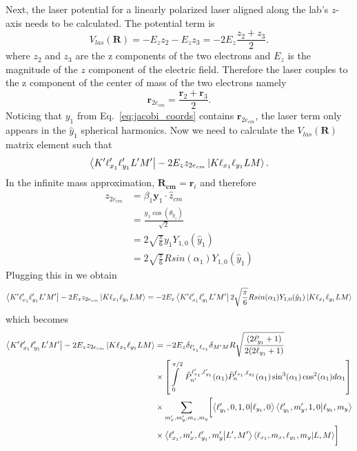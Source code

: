 Next, the laser potential for a linearly polarized laser aligned along the lab's $z$-axis needs to be calculated. The potential term is
\begin{equation}
     V_{las}(\mathbf{R}) = - E_z z_2 - E_z z_3 = - 2E_z \frac{z_2 + z_3}{2}.
\end{equation} 
where $z_2$ and $z_3$ are the z components of the two electrons and $E_z$ is the magnitude of the $z$ component of the electric field.
Therefore the laser couples to the z component of the center of mass of the two electrons namely
\begin{equation}
    \mathbf{r}_{2e_{cm}} = \frac{\mathbf{r}_2 + \mathbf{r}_3}{2}.
\end{equation}
Noticing that $y_1$ from Eq.~\ref{eq:jacobi_coords} contains $\mathbf{r}_{2e_{cm}}$, the laser term only appears in the $\hat{y}_1$ spherical harmonics. 
Now we need to calculate the $V_{las}(\mathbf{R})$ matrix element such that
\begin{equation}
    \bra{K'\ell_{x_1}'\ell_{y_1}'L'M'} -2E_z z_{2e_{cm}} \ket{K \ell_{x_1} \ell_{y_1}LM}.
\end{equation} 
In the infinite mass approximation, $\mathbf{R_{cm}}=\mathbf{r}_i$  and therefore 
\begin{align}
z_{2e_{cm}}&=\beta_1 \mathbf{y}_1\cdot\hat{z}_{cm} \\
&= \frac{y_1\cos(\theta_{y_1})}{\sqrt{2}}\\
&= 2 \sqrt{\frac{\pi}{6}}y_1Y_{1,0}(\hat{y}_1)\\
&= 2 \sqrt{\frac{\pi}{6}}Rsin(\alpha_1)Y_{1,0}(\hat{y}_1)
\end{align}
Plugging this in we obtain 
\begin{equation}
    \bra{K'\ell_{x_1}'\ell_{y_1}'L'M'}  -2E_z z_{2e_{cm}} \ket{K \ell_{x_1} \ell_{y_1}LM} =-2E_z \bra{K'\ell_{x_1}'\ell_{y_1}'L'M'} 2\sqrt{\frac{\pi}{6}}Rsin(\alpha_1)Y_{1,0}(\hat{y}_1) \ket{K \ell_{x_1} \ell_{y_1}LM} 
\end{equation}
which becomes
\begin{align}
    \nonumber\bra{K'\ell_{x_1}'\ell_{y_1}'L'M'} -2E_z z_{2e_{cm}} \ket{K \ell_{x_1} \ell_{y_1}LM} &= -2E_z\delta_{\ell_{x_1}'\ell_{x_1}} \delta_{M'M} R  \sqrt{\frac{(2\ell_{y_1}'+1)}{2(2\ell_{y_1}+1)}}\\\nonumber
    & \times \left[\int\limits_0^{\pi/2}\ \tilde{P}^{\ell_{x_1}',\ell_{y_1}'}_{n'}(\alpha_1) \tilde{P}^{\ell_{x_1},\ell_{y_1}}_{n}(\alpha_1) \sin^3(\alpha_1) \cos^2(\alpha_1)d\alpha_1\right]\\\nonumber
    & \times \sum\limits_{m_x',m_y',m_x,m_y} \biggl[\bra{\ell_{y_1}',0,1,0}\ket{\ell_{y_1},0} \bra{\ell_{y_1}',m_y',1,0}\ket{\ell_{y_1},m_y}\\
    & \times \bra{\ell_{x_1}',m_x',\ell_{y_1}',m_y'}\ket{L',M'} \bra{\ell_{x_1},m_x,\ell_{y_1},m_y}\ket{L,M}\biggr]
\end{align}
